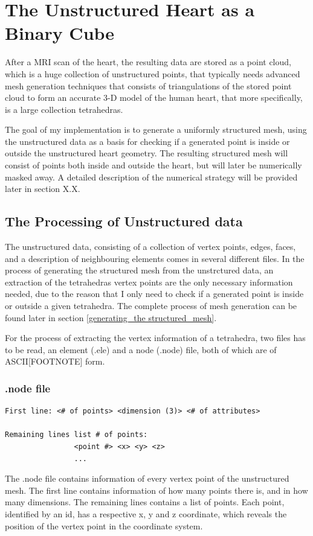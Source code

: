 \chapter{The Unstructured Heart as a Binary Cube} 
After a MRI scan of the heart, the resulting data are stored as a point cloud, which is a huge collection of unstructured points, that typically needs advanced mesh generation techniques that consists of triangulations of the stored point cloud to form an accurate 3-D model of the human heart, that more specifically, is a large collection tetrahedras. 

The goal of my implementation is to generate a uniformly structured mesh, using the unstructured data as a basis for checking if a generated point is inside or outside the unstructured heart geometry. The resulting structured mesh will consist of points both inside and outside the heart, but will later be numerically masked away. A detailed description of the numerical strategy will be provided later in section X.X.

\section{The Processing of Unstructured data}
The unstructured data, consisting of a collection of vertex points, edges, faces, and a description of neighbouring elements comes in several different files. In the process of generating the structured mesh from the unstrctured data, an extraction of the tetrahedras vertex points are the only necessary information needed, due to the reason that I only need to check if a generated point is inside or outside a given tetrahedra. The complete process of mesh generation can be found later in section \ref{generating_the structured_mesh}.

For the process of extracting the vertex information of a tetrahedra, two files has to be read, an element (.ele) and a node (.node) file, both of which are of ASCII[FOOTNOTE] form.

\subsection{.node file}
\begin{lstlisting}[caption=.node file]
First line:	<# of points> <dimension (3)> <# of attributes>

Remaining lines list # of points:
				<point #> <x> <y> <z> 
				...
\end{lstlisting}
The .node file contains information of every vertex point of the unstructured mesh. The first line contains information of how many points there is, and in how many dimensions. The remaining lines contains a list of points. Each point, identified by an id, has a respective x, y and z coordinate, which reveals the position of the vertex point in the coordinate system.

